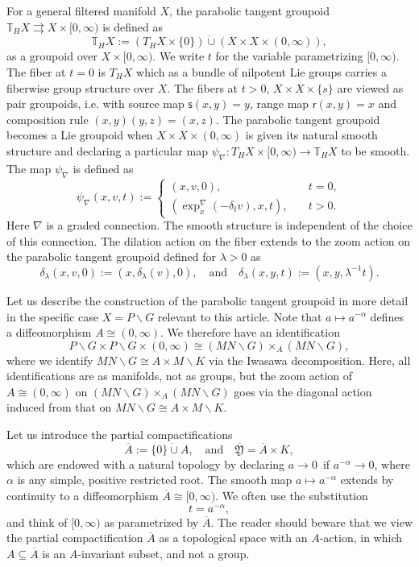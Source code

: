 \documentclass[a4paper,reqno]{amsart}
\numberwithin{equation}{section}
\theoremstyle{definition}
\theoremstyle{remark}
\begin{document}
For a general filtered manifold $X$, the parabolic tangent groupoid $\mathbb{T}_HX \rightrightarrows X\times [0,\infty)$ is defined as 
$$\mathbb{T}_HX:=(T_HX\times \{0\})\dot{\cup}(X\times X\times (0,\infty)),$$
as a groupoid over $X\times [0,\infty)$. We write $t$ for the variable parametrizing $[0,\infty)$. The fiber at $t=0$ is $T_HX$ which as a bundle of nilpotent Lie groups carries a fiberwise group structure over $X$. The fibers at $t>0$, $X\times X\times \{s\}$ are viewed as pair groupoids, i.e. with source map $\mathsf{s}(x,y)=y$, range map $\mathsf{r}(x,y)=x$ and composition rule $(x,y)(y,z)=(x,z)$. The parabolic tangent groupoid becomes a Lie groupoid when $X\times X\times (0,\infty)$ is given its natural smooth structure and declaring a particular map $\psi_\nabla:T_HX\times [0,\infty)\to \mathbb{T}_HX$ to be smooth. The map $\psi_\nabla$ is defined as 
\begin{equation}
\label{psinabladef}
\psi_\nabla(x,v,t):=
\begin{cases}
(x,v,0), \quad &t=0,\\
(\exp_x^\nabla(-\delta_tv),x,t), \quad &t>0.\end{cases}
\end{equation}
Here $\nabla$ is a graded connection. The smooth structure is independent of the choice of this connection. The dilation action on the fiber extends to the zoom action on the parabolic tangent groupoid defined for $\lambda>0$ as
$$\delta_\lambda(x,v,0):=(x,\delta_\lambda(v),0),\quad\mbox{and}\quad \delta_\lambda(x,y,t):=(x,y,\lambda^{-1}t).$$
\newline 

Let us describe the construction of the parabolic tangent groupoid in more detail in the specific case $X=P\backslash G$ relevant to this article. Note that $a\mapsto a^{-\alpha}$ defines a diffeomorphism $A\cong (0,\infty)$. We therefore have an identification 
$$P\backslash G\times P\backslash G\times (0,\infty)\cong (MN\backslash G)\times_A (MN\backslash G),$$
where we identify $MN\backslash G\cong A\times M\backslash K$ via the Iwasawa decomposition. Here, all identifications are as manifolds, not as groups, but the zoom action of $A\cong (0,\infty)$ on $(MN\backslash G)\times_A (MN\backslash G)$ goes via the diagonal action induced from that on  $MN\backslash G\cong A\times M\backslash K$. 

Let us introduce the partial compactifications
$$\overline{A}:=\{0\}\dot{\cup} A,\quad\mbox{and}\quad \overline{\mathfrak{Y}}=\overline{A}\times K,$$
which are endowed with a natural topology by declaring $a\to 0$ if $a^{-\alpha}\to 0$, where $\alpha$ is any simple, positive restricted root. The smooth map $a\mapsto a^{-\alpha}$ extends by continuity to a diffeomorphism $\overline{A}\cong [0,\infty)$. We often use the substitution 
$$t=a^{-\alpha},$$
and think of $[0,\infty)$ as parametrized by $\overline{A}$. The reader should beware that we view the partial compactification $\overline{A}$ as a topological space with an $A$-action, in which $A\subseteq \overline{A}$ is an $A$-invariant subset, and not a group. 
\end{document}
